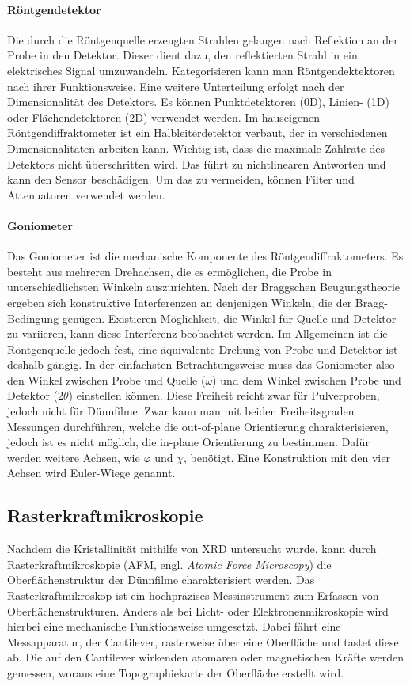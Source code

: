\paragraph{Röntgendetektor}
Die durch die Röntgenquelle erzeugten Strahlen gelangen nach Reflektion an der Probe in den Detektor.
Dieser dient dazu, den reflektierten Strahl in ein elektrisches Signal umzuwandeln.
Kategorisieren kann man Röntgendektektoren nach ihrer Funktionsweise.
Eine weitere Unterteilung erfolgt nach der Dimensionalität des Detektors.
Es können Punktdetektoren (0D), Linien- (1D) oder Flächendetektoren (2D) verwendet werden.
Im hauseigenen Röntgendiffraktometer ist ein Halbleiterdetektor verbaut, der in verschiedenen Dimensionalitäten
arbeiten kann.
Wichtig ist, dass die maximale Zählrate des Detektors nicht überschritten wird.
Das führt zu nichtlinearen Antworten und kann den Sensor beschädigen.
Um das zu vermeiden, können Filter und Attenuatoren verwendet werden.

\paragraph{Goniometer}
Das Goniometer ist die mechanische Komponente des Röntgendiffraktometers.
Es besteht aus mehreren Drehachsen, die es ermöglichen, die Probe in unterschiedlichsten Winkeln auszurichten.
Nach der Braggschen Beugungstheorie ergeben sich konstruktive Interferenzen an denjenigen Winkeln, die der
Bragg-Bedingung genügen.
Existieren Möglichkeit, die Winkel für Quelle und Detektor zu variieren, kann diese Interferenz beobachtet werden.
Im Allgemeinen ist die Röntgenquelle jedoch fest, eine äquivalente Drehung von Probe und Detektor ist deshalb gängig.
In der einfachsten Betrachtungsweise muss das Goniometer also den Winkel zwischen Probe und Quelle ($\omega$) und dem
Winkel zwischen Probe und Detektor ($2\theta$) einstellen können.
Diese Freiheit reicht zwar für Pulverproben, jedoch nicht für Dünnfilme.
Zwar kann man mit beiden Freiheitsgraden Messungen durchführen, welche die out-of-plane Orientierung charakterisieren,
jedoch ist es nicht möglich, die in-plane Orientierung zu bestimmen.
Dafür werden weitere Achsen, wie $\varphi$ und $\chi$, benötigt.
Eine Konstruktion mit den vier Achsen wird Euler-Wiege genannt.

\subsection{Rasterkraftmikroskopie}\label{subsec:afm}
Nachdem die Kristallinität mithilfe von XRD untersucht wurde, kann durch Rasterkraftmikroskopie (AFM, engl.
\textit{Atomic Force Microscopy}) die Oberflächenstruktur der Dünnfilme charakterisiert werden.
Das Rasterkraftmikroskop ist ein hochpräzises Messinstrument zum Erfassen von Oberflächenstrukturen.
Anders als bei Licht- oder Elektronenmikroskopie wird hierbei eine mechanische Funktionsweise umgesetzt.
Dabei fährt eine Messapparatur, der Cantilever, rasterweise über eine Oberfläche und tastet diese ab.
Die auf den Cantilever wirkenden atomaren oder magnetischen Kräfte werden gemessen, woraus eine Topographiekarte der
Oberfläche erstellt wird.

